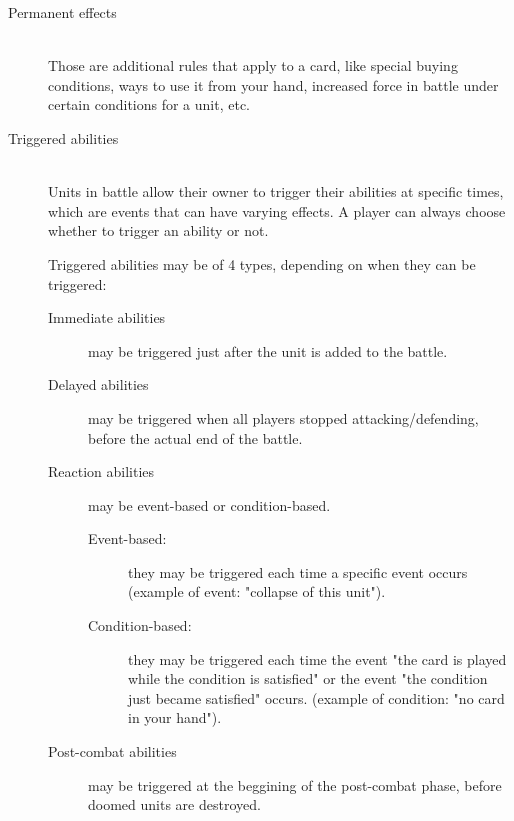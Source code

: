 \documentclass[a4paper]{article}
\begin{document}
    \begin{description}
        \item[Permanent effects] \hfill \\
        	Those are additional rules that apply to a card,
            like special buying conditions, ways to use it from your hand, 
            increased force in battle under certain conditions for a unit, etc.
        \item[Triggered abilities] \hfill \\
            Units in battle allow their owner to trigger their abilities at
            specific times, which are events that can have varying effects.
            A player can always choose whether to trigger an ability or not.
            
            Triggered abilities may be of 4 types,
            depending on when they can be triggered:
            \begin{description}
        	        \item[Immediate abilities]
                    	may be triggered just after the unit is added to the battle.
        	        \item[Delayed abilities]
                    may be triggered when all players stopped attacking/defending,
	                before the actual end of the battle.
        	        \item[Reaction abilities] may be event-based or condition-based.
	                \begin{description}
                        \item[Event-based:]
                        they may be triggered each time a specific event occurs
                        (example of event: "collapse of this unit").
                        \item[Condition-based:]
                        they may be triggered each time the event
                        "the card is played while the condition is satisfied" or the
                        event "the condition just became satisfied" occurs.
                        (example of condition: "no card in your hand").
                    \end{description}
        	        \item[Post-combat abilities] may be triggered at the beggining of the
                    post-combat phase, before doomed units are destroyed.
            \end{description}
    \end{description}
    
\end{document}
